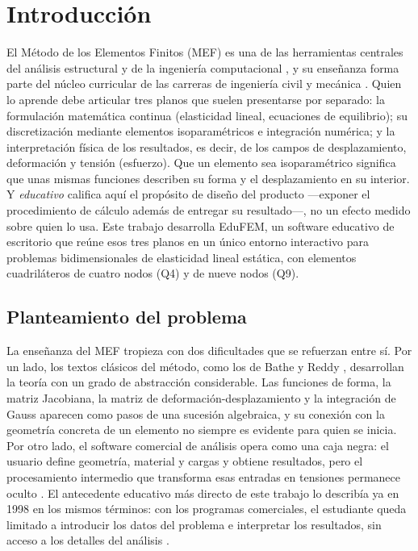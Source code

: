\chapter*{Introducción}

El Método de los Elementos Finitos (MEF) es una de las herramientas centrales del análisis estructural y de la ingeniería computacional \autocite{zienkiewicz2013fem,cook2002concepts}, y su enseñanza forma parte del núcleo curricular de las carreras de ingeniería civil y mecánica \autocite[p.~1160]{perezsantiago2023fem}. Quien lo aprende debe articular tres planos que suelen presentarse por separado: la formulación matemática continua (elasticidad lineal, ecuaciones de equilibrio); su discretización mediante elementos isoparamétricos e integración numérica; y la interpretación física de los resultados, es decir, de los campos de desplazamiento, deformación y tensión (esfuerzo). Que un elemento sea isoparamétrico significa que unas mismas funciones describen su forma y el desplazamiento en su interior. Y \emph{educativo} califica aquí el propósito de diseño del producto ---exponer el procedimiento de cálculo además de entregar su resultado---, no un efecto medido sobre quien lo usa. Este trabajo desarrolla EduFEM, un software educativo de escritorio que reúne esos tres planos en un único entorno interactivo para problemas bidimensionales de elasticidad lineal estática, con elementos cuadriláteros de cuatro nodos (Q4) y de nueve nodos (Q9).

\section*{Planteamiento del problema}

La enseñanza del MEF tropieza con dos dificultades que se refuerzan entre sí. Por un lado, los textos clásicos del método, como los de Bathe y Reddy \autocite{bathe2014fem,reddy2006introduction}, desarrollan la teoría con un grado de abstracción considerable. Las funciones de forma, la matriz Jacobiana, la matriz de deformación-desplazamiento y la integración de Gauss aparecen como pasos de una sucesión algebraica, y su conexión con la geometría concreta de un elemento no siempre es evidente para quien se inicia. Por otro lado, el software comercial de análisis opera como una caja negra: el usuario define geometría, material y cargas y obtiene resultados, pero el procesamiento intermedio que transforma esas entradas en tensiones permanece oculto \autocite[p.~1160]{perezsantiago2023fem}. El antecedente educativo más directo de este trabajo lo describía ya en 1998 en los mismos términos: con los programas comerciales, el estudiante queda limitado a introducir los datos del problema e interpretar los resultados, sin acceso a los detalles del análisis \autocite[p.~246]{suarez1998edelas2d}.

